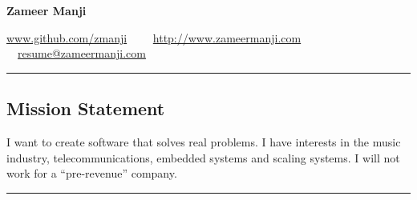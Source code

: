 \documentclass[10pt,letterpaper]{article}
\begin{document}
\begin{center}
{\huge \textbf{Zameer Manji}}


\href{http://www.github.com/zmanji/}{www.github.com/zmanji}\ \ \textbullet
\ \ \href{http://www.zameermanji.com}{http://www.zameermanji.com}\ \ \textbullet
\ \ \href{malto:resume@zameermanji.com}{resume@zameermanji.com}

\end{center}

\hrule
\vspace{-0.4em}
\subsection*{Mission Statement}
I want to create software that solves real problems. I have interests in the
music industry, telecommunications, embedded systems and scaling systems. I will
not work for a ``pre-revenue'' company.
\\

\hrule
\vspace{-0.4em}
\end{document}
